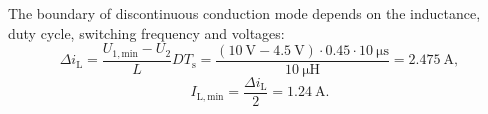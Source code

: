 \begin{solutionblock}
    The boundary of discontinuous conduction mode depends on the inductance, duty cycle, switching frequency and voltages:
    \begin{equation}
        \Delta i_\mathrm{L} = \frac{U_{\mathrm{1,min}} - U_\mathrm{2}}{L} D T_\mathrm{s} = \frac{(\SI{10}{\volt} - \SI{4.5}{\volt}) \cdot 0.45 \cdot \SI{10}{\micro \second}}{\SI{10}{\micro \henry}} = \SI{2.475}{\ampere},
    \end{equation}
    \begin{equation}
        I_{\mathrm{L,min}} = \frac{\Delta i_\mathrm{L}}{2} = \SI{1.24}{\ampere}.
    \end{equation}
\end{solutionblock}







